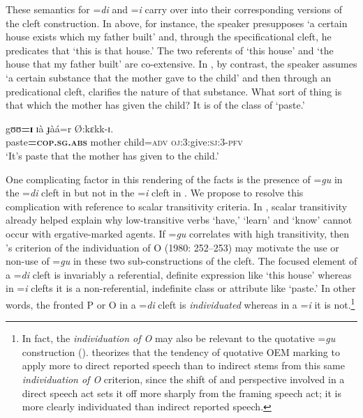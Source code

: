 \documentclass[output=paper,modfonts]{langscibook}
\begin{document}
These semantics for =\textit{di} and =\textit{i} carry over into their corresponding versions of the cleft construction. In  above, for instance, the speaker presupposes ‘a certain house exists which my father built’ and, through the specificational cleft, he predicates that ‘this is that house.’ The two referents of ‘this house’ and ‘the house that my father built’ are co-extensive. In , by contrast, the speaker assumes ‘a certain substance that the mother gave to the child’ and then through an predicational cleft, clarifies the nature of that substance. What sort of thing is that which the mother has given the child? It is of the class of ‘paste.’

\ea\label{ex:wolfe:25}
\gll gʊʊ\textbf{=ɪ} ɪà ɟàá=r Ø:kɛkk-ɪ.\\
     paste\textbf{=}\textsc{\textbf{cop}}\textbf{.}\textsc{\textbf{sg}}\textbf{.}\textsc{\textbf{abs}}\textbf{} mother child=\textsc{adv} \textsc{oj}:3:give:\textsc{sj}:3-\textsc{pfv}\\
\glt ‘It’s paste that the mother has given to the child.’ \citep[139]{Jakobi2006}
\z

One complicating factor in this rendering of the facts is the presence of =\textit{gu} in the =\textit{di} cleft in  but not in the =\textit{i} cleft in . We propose to resolve this complication with reference to  scalar transitivity criteria. In , scalar transitivity already helped explain why low-transitive verbs ‘have,’ ‘learn’ and ‘know’ cannot occur with ergative-marked agents. If =\textit{gu} correlates with high transitivity, then \citeauthor{HopperThompson1980}’s criterion of the individuation of O (1980: 252--253) may motivate the use or non-use of =\textit{gu} in these two sub-constructions of the  cleft. The focused element of a =\textit{di} cleft is invariably a referential, definite expression like ‘this house’ whereas in =\textit{i} clefts it is a non-referential, indefinite class or attribute like ‘paste.’ In other words, the fronted P or O in a =\textit{di} cleft is \textit{individuated} whereas in a =\textit{i} it is not.\footnote{In fact, the \textit{individuation of O} may also be relevant to the quotative =\textit{gu} construction (). \citet{Rumsey2010} theorizes that the tendency of quotative OEM marking to apply more to direct reported speech than to indirect stems from this same \textit{individuation of O} criterion, since the shift of  and perspective involved in a direct speech act sets it off more sharply from the framing speech act; it is more clearly individuated than indirect reported speech.}  
\end{document}

